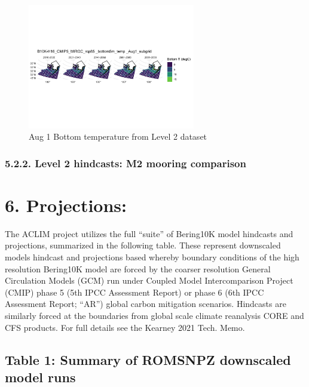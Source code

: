 \documentclass[
]{article}
\begin{document}
\begin{figure}
\centering
\includegraphics[width=0.65\textwidth,height=\textheight]{Figs/sub_grid_mn_BT_Aug1.jpg}
\caption{Aug 1 Bottom temperature from Level 2 dataset}
\end{figure}

\hypertarget{level-2-hindcasts-m2-mooring-comparison}{%
\subsubsection{5.2.2. Level 2 hindcasts: M2 mooring
comparison}\label{level-2-hindcasts-m2-mooring-comparison}}

\hypertarget{projections}{%
\section{6. Projections:}\label{projections}}

The ACLIM project utilizes the full ``suite'' of Bering10K model
hindcasts and projections, summarized in the following table. These
represent downscaled models hindcast and projections based whereby
boundary conditions of the high resolution Bering10K model are forced by
the coarser resolution General Circulation Models (GCM) run under
Coupled Model Intercomparison Project (CMIP) phase 5 (5th IPCC
Assessment Report) or phase 6 (6th IPCC Assessment Report; ``AR'')
global carbon mitigation scenarios. Hindcasts are similarly forced at
the boundaries from global scale climate reanalysis CORE and CFS
products. For full details see the Kearney 2021 Tech. Memo.

\hypertarget{table-1-summary-of-romsnpz-downscaled-model-runs}{%
\subsection{Table 1: Summary of ROMSNPZ downscaled model
runs}\label{table-1-summary-of-romsnpz-downscaled-model-runs}}
\end{document}
